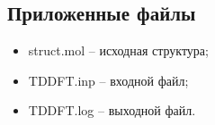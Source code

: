 \subsection{Приложенные файлы}
\begin{itemize}
    \item struct.mol – исходная структура;
    \item TDDFT.inp – входной файл;
    \item TDDFT.log – выходной файл.
\end{itemize}{}